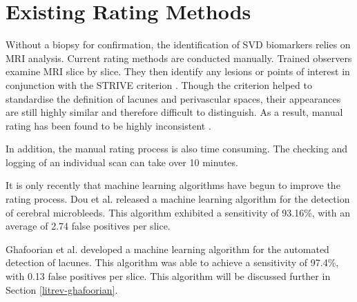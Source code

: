 \section{Existing Rating Methods}\label{svd-rating}

Without a biopsy for confirmation, the identification of SVD biomarkers relies on MRI analysis. Current rating methods are conducted manually. Trained observers examine MRI slice by slice. They then identify any lesions or points of interest in conjunction with the STRIVE criterion \cite{WardlawJ.M.2013Nsfr}. Though the criterion helped to standardise the definition of lacunes and perivascular spaces, their appearances are still highly similar and therefore difficult to distinguish. As a result, manual rating has been found to be highly inconsistent \cite{PotterGillian2015CPSV}. 

In addition, the manual rating process is also time consuming. The checking and logging of an individual scan can take over 10 minutes.

It is only recently that machine learning algorithms have begun to improve the rating process. Dou et al. \cite{DouQ.2016ADoC} released a machine learning algorithm for the detection of cerebral microbleeds. This algorithm exhibited a sensitivity of 93.16\%, with an average of 2.74 false positives per slice. 

Ghafoorian et al. \cite{GhafoorianM.2017Dml3} developed a machine learning algorithm for the automated detection of lacunes. This algorithm was able to achieve a sensitivity of 97.4\%, with 0.13 false positives per slice. This algorithm will be discussed further in Section \ref{litrev-ghafoorian}.


%